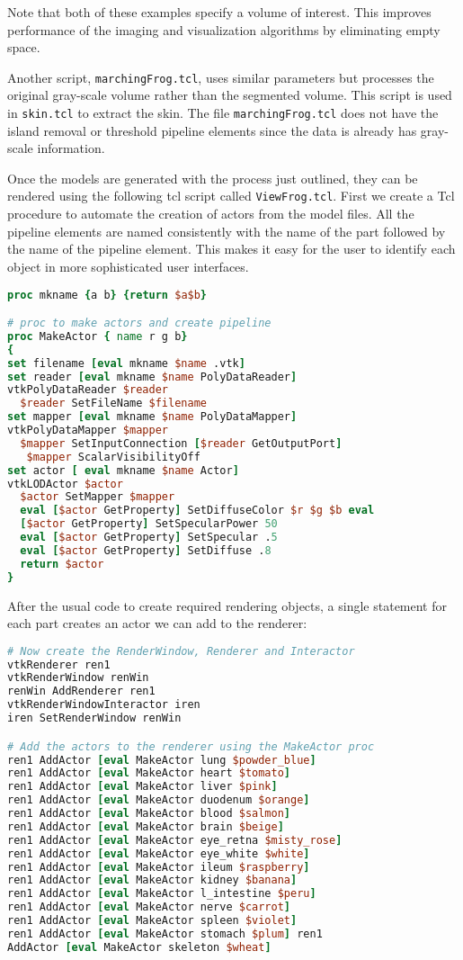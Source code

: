 Note that both of these examples specify a volume of interest. This improves performance of the imaging and visualization algorithms by eliminating empty space.

Another script, \texttt{marchingFrog.tcl}, uses similar parameters but processes the original gray-scale volume rather than the segmented volume. This script is used in \texttt{skin.tcl} to extract the skin. The file \texttt{marchingFrog.tcl} does not have the island removal or threshold pipeline elements since the data is already has gray-scale information.

Once the models are generated with the process just outlined, they can be rendered using the following tcl script called \texttt{ViewFrog.tcl}. First we create a Tcl procedure to automate the creation of actors from the model files. All the pipeline elements are named consistently with the name of the part followed by the name of the pipeline element. This makes it easy for the user to identify each object in more sophisticated user interfaces.

\begin{lstlisting}[language=TCL, caption={Automating the creation of actors.}]
proc mkname {a b} {return $a$b}

# proc to make actors and create pipeline
proc MakeActor { name r g b}
{
set filename [eval mkname $name .vtk]
set reader [eval mkname $name PolyDataReader]
vtkPolyDataReader $reader
  $reader SetFileName $filename
set mapper [eval mkname $name PolyDataMapper]
vtkPolyDataMapper $mapper
  $mapper SetInputConnection [$reader GetOutputPort]
   $mapper ScalarVisibilityOff
set actor [ eval mkname $name Actor]
vtkLODActor $actor
  $actor SetMapper $mapper
  eval [$actor GetProperty] SetDiffuseColor $r $g $b eval
  [$actor GetProperty] SetSpecularPower 50
  eval [$actor GetProperty] SetSpecular .5
  eval [$actor GetProperty] SetDiffuse .8
  return $actor
}
\end{lstlisting}

After the usual code to create required rendering objects, a single statement for each part creates an actor we can add to the renderer:

\begin{lstlisting}[language=TCL, caption={Create the actors.}]
# Now create the RenderWindow, Renderer and Interactor
vtkRenderer ren1
vtkRenderWindow renWin
renWin AddRenderer ren1
vtkRenderWindowInteractor iren
iren SetRenderWindow renWin

# Add the actors to the renderer using the MakeActor proc
ren1 AddActor [eval MakeActor lung $powder_blue]
ren1 AddActor [eval MakeActor heart $tomato]
ren1 AddActor [eval MakeActor liver $pink]
ren1 AddActor [eval MakeActor duodenum $orange]
ren1 AddActor [eval MakeActor blood $salmon]
ren1 AddActor [eval MakeActor brain $beige]
ren1 AddActor [eval MakeActor eye_retna $misty_rose]
ren1 AddActor [eval MakeActor eye_white $white]
ren1 AddActor [eval MakeActor ileum $raspberry]
ren1 AddActor [eval MakeActor kidney $banana]
ren1 AddActor [eval MakeActor l_intestine $peru]
ren1 AddActor [eval MakeActor nerve $carrot]
ren1 AddActor [eval MakeActor spleen $violet]
ren1 AddActor [eval MakeActor stomach $plum] ren1
AddActor [eval MakeActor skeleton $wheat]
\end{lstlisting}

